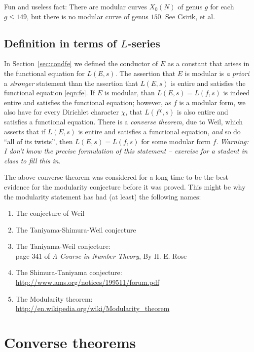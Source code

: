 \documentclass{book}
\begin{document}
\begin{remark}
Fun and useless fact:
There are modular curves $X_0(N)$ of genus $g$ for each $g\leq 149$,
but there is no modular curve of genus $150$.  See Csirik, et al.
\end{remark}

\subsection{Definition in terms of $L$-series}

In Section~\ref{sec:condfe} we defined the conductor of $E$
as a constant that arises in the functional equation
for $L(E,s)$.   The assertion that $E$ is modular is
{\em a priori} a {\em stronger} statement than the assertion
that $L(E,s)$ is entire and satisfies the functional
equation \eqref{eqn:fe}.  If $E$ is modular, than $L(E,s)=L(f,s)$
is indeed entire and satisfies the functional equation;
however, as $f$ is a modular form, we also have for
every Dirichlet character $\chi$,  that
$L(f^{\chi},s)$ is also entire and satisfies a functional
equation.  There is a {\em converse theorem}, due to Weil,
which asserts that if $L(E,s)$ is entire and satisfies
a functional equation, {\em and} so do ``all of its twists'', then
$L(E,s)=L(f,s)$ for some modular form $f$.
{\em Warning: I don't know the precise formulation
of this statement -- exercise for a student in class to fill
this in.}

The above converse theorem was considered for a long time to be
the best evidence for the modularity conjecture before
it was proved.  This might be why the modularity statement
has had (at least) the following names:
\begin{enumerate}
\item The conjecture of Weil
\item The Taniyama-Shimura-Weil conjecture
\item The Taniyama-Weil conjecture:\\ page 341 of {\em A Course in Number Theory}, By H. E. Rose
\item The Shimura-Taniyama conjecture:\\ \url{http://www.ams.org/notices/199511/forum.pdf}
\item The Modularity theorem:\\ \url{http://en.wikipedia.org/wiki/Modularity_theorem}
\end{enumerate}

\section{Converse theorems}
\end{document}
